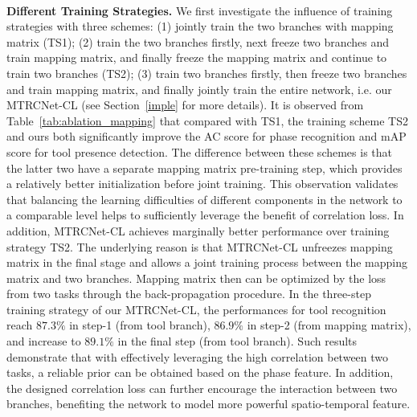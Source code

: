 \documentclass{elsarticle}
\begin{document}
\\
\textbf{Different Training Strategies.}
We first investigate the influence of training strategies with three schemes:
(1) jointly train the two branches with mapping matrix (TS1);
(2) train the two branches firstly, next freeze two branches and train mapping matrix, and finally freeze the mapping matrix and continue to train two branches (TS2);
(3) train two branches firstly, then freeze two branches and train mapping matrix, and finally jointly train the entire network, i.e. our MTRCNet-CL (see Section~\ref{imple} for more details).
It is observed from Table~\ref{tab:ablation_mapping} that
compared with TS1, the training scheme TS2 and ours both significantly improve the AC score for phase recognition and mAP score for tool presence detection.
The difference between these schemes is that the latter two have a separate mapping matrix pre-training step, 
which provides a relatively better initialization before joint training. 
This observation validates that balancing the learning difficulties of different components in the network to a comparable level
helps to sufficiently leverage the benefit of correlation loss.
In addition, MTRCNet-CL achieves marginally better performance over training strategy TS2.
The underlying reason is that MTRCNet-CL unfreezes mapping matrix in the final stage and allows a joint training process between the mapping matrix and two branches.
Mapping matrix then can be optimized by the loss from two tasks through the back-propagation procedure.
In the three-step training strategy of our MTRCNet-CL, the performances for tool recognition reach $87.3\%$ in step-1 (from tool branch), $86.9\%$ in step-2 (from mapping matrix), and increase to $89.1\%$ in the final step (from tool branch).
Such results demonstrate that with effectively leveraging the high correlation between two tasks, a reliable prior can be obtained based on the phase feature.
In addition, the designed correlation loss can further encourage the interaction between two branches, benefiting the network to model more powerful spatio-temporal feature.
\end{document}
